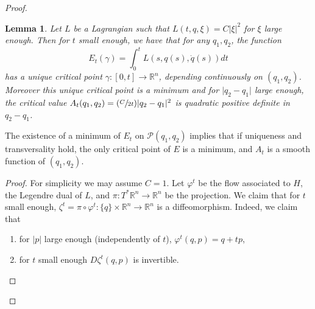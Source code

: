 \documentclass[JEP,XML,SOM,NoFloatCountersInSection,Unicode,published]{cedram}
\newcommand{\Psfrac}[2]{(\sfrac{#1}{#2})}
\numberwithin{equation}{section}
\theoremstyle{plain}
\newtheorem{lemma}[theorem]{Lemma}
\theoremstyle{definition}
\theoremstyle{remark}
\begin{document}
\begin{proof}
\begin{lemma}
Let $L$ be a Lagrangian such that $L(t,q,\xi)=C \vert \xi \vert^{2}$ for $\xi$ large enough. Then for $t$ small enough, we have that for any $q_{1},q_{2}$, the function\vspace*{-3pt}
\[
E_{t}(\gamma)=\int_{0}^{t}L(s,q(s),\dot q(s)) dt
\]
has a unique critical point $\gamma: [0,t] \to {\mathbb R} ^{n}$, depending continuously on $(q_{1},q_{2})$. Moreover this unique critical point is a minimum and for $ \vert q_{2}-q_{1} \vert $ large enough, the critical value $A_{t}(q_{1},q_{2})= \Psfrac{C}{2t} \vert q_{2}-q_{1}\vert ^{2} $ is quadratic positive definite in $q_{2}-q_{1}$.
\end{lemma} The existence of a minimum of $E_{t}$ on ${\mathcal P}(q_{1},q_{2})$ implies that if uniqueness and transversality hold, the only critical point of $E$ is a minimum, and $A_{t}$ is a smooth function of $(q_{1},q_{2})$.
\begin{proof} For simplicity we may assume $C=1$.
Let $\varphi^{t}$ be the flow associated to $H$, the Legendre dual of $L$, and $\pi: T^{*} {\mathbb R} ^{n} \to {\mathbb R}^{n}$ be the projection. We claim that for $t$ small enough, $\zeta^{t}=\pi\circ \varphi^{t}: \{q\}\times {\mathbb R} ^{n} \to {\mathbb R}^{n} $ is a diffeomorphism. Indeed, we claim that
\begin{enumerate}
\item \label{A}for $ \vert p \vert $ large enough (independently of $t$), $\varphi^{t}(q,p)=q+tp$,
\item \label{B} for $t$ small enough $D\zeta^{t}(q,p)$ is invertible.
\end{enumerate}


\end{proof}
\end{proof}
\end{document}
